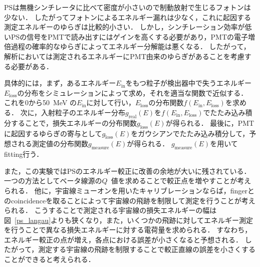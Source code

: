   PSは無機シンチレータに比べて密度が小さいので制動放射で生じるフォトンは少ない．
  したがってフォトンによるエネルギー漏れは少なく，これに起因する測定エネルギーのゆらぎは比較的小さい．
  しかし，シンチレーション効率が低いPSの信号をPMTで読み出すにはゲインを高くする必要があり，PMTの電子増倍過程の確率的なゆらぎによってエネルギー分解能は悪くなる．
  したがって，解析においては測定されるエネルギーにPMT由来のゆらぎがあることを考慮する必要がある．

  具体的には，まず，あるエネルギー$E_\mathrm{in}$をもつ粒子が検出器中で失うエネルギー$E_\mathrm{loss}$の分布をシミュレーションによって求め，それを適当な関数で近似する．
  これを0から50~MeV の$E_\mathrm{in}$に対して行い，$E_\mathrm{loss}$の分布関数$f(E_\mathrm{in},E_\mathrm{loss})$を求める．
  次に，入射粒子のエネルギー分布$g_{\mathrm{real}}(E)$を$f(E_\mathrm{in},E_\mathrm{loss})$でたたみ込み積分することで，損失エネルギーの分布関数$g_{\mathrm{loss}}(E)$が得られる．
  最後に，PMTに起因するゆらぎの寄与として$g_{\mathrm{loss}}(E)$をガウシアンでたたみ込み積分して，予想される測定値の分布関数$g_{\mathrm{measure}}(E)$が得られる．
  $g_{\mathrm{measure}}(E)$を用いてfitting行う．
  
  また，この実験ではPSのエネルギー較正に改善の余地が大いに残されている．
  一つの方法としてベータ線源の$Q$~値を求めることで較正点を増やすことが考えられる．
  他に，宇宙線ミューオンを用いたキャリブレーションならば，fingerとのcoincidenceを取ることによって宇宙線の飛跡を制限して測定を行うことが考えられる．
  こうすることで測定される宇宙線の損失エネルギーの幅は図~\ref{ps_langau}よりも狭くなり，また，いくつかの飛跡に対してエネルギー測定を行うことで異なる損失エネルギーに対する電荷量を求められる．
  すなわち，エネルギー較正の点が増え，各点における誤差が小さくなると予想される．
  したがって，測定する宇宙線の飛跡を制限することで較正直線の誤差を小さくすることができると考えられる．

